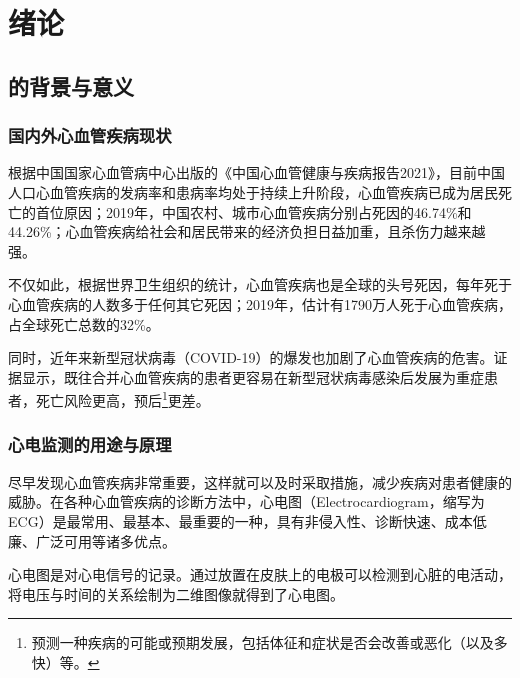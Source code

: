 

\chapter{绪论}\label{ch:intro}


\section{\app 的背景与意义}\label{sec:background}

\subsection{国内外心血管疾病现状}\label{subsec:disease}

根据中国国家心血管病中心出版的《中国心血管健康与疾病报告2021》，目前中国人口心血管疾病的发病率和患病率均处于持续上升阶段，心血管疾病已成为居民死亡的首位原因；2019年，中国农村、城市心血管疾病分别占死因的46.74\%和44.26\%；心血管疾病给社会和居民带来的经济负担日益加重，且杀伤力越来越强\cite{Zhongguoxinxieguanjiankangyujibingbaogao20212022}。

不仅如此，根据世界卫生组织的统计，心血管疾病也是全球的头号死因，每年死于心血管疾病的人数多于任何其它死因；2019年，估计有1790万人死于心血管疾病，占全球死亡总数的32\%\cite{CardiovascularDiseasesCVDs}。

同时，近年来新型冠状病毒（COVID-19）的爆发也加剧了心血管疾病的危害。证据显示，既往合并心血管疾病的患者更容易在新型冠状病毒感染后发展为重症患者，死亡风险更高，预后\footnote{预测一种疾病的可能或预期发展，包括体征和症状是否会改善或恶化（以及多快）等。}更差\cite{zhangXinxingguanzhuangbingdufeiyanyuxinxieguanjibing2020}。

\subsection{心电监测的用途与原理}\label{subsec:monitoring}

尽早发现心血管疾病非常重要，这样就可以及时采取措施，减少疾病对患者健康的威胁\cite{CardiovascularDiseasesCVDs}。在各种心血管疾病的诊断方法中，心电图（Electrocardiogram，缩写为ECG）是最常用、最基本、最重要的一种，具有非侵入性、诊断快速、成本低廉、广泛可用等诸多优点\cite{Xinxieguanjibingzhenduanliuchengyuzhiliaocelue2007}。

心电图是对心电信号的记录。通过放置在皮肤上的电极可以检测到心脏的电活动，将电压与时间的关系绘制为二维图像就得到了心电图。

